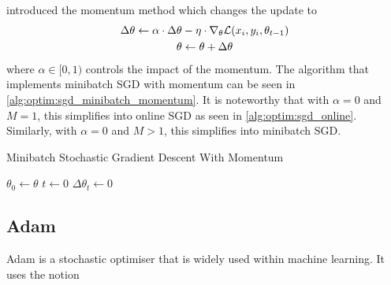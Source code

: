 \cite{rumelhart_learning_1986} introduced the momentum method which changes the update to
\begin{equation}
    \begin{gathered}
        \Delta \theta \leftarrow \alpha \cdot \Delta \theta - \eta  \cdot \nabla_\theta \mathcal{L}(x_i, y_i,\theta_{t-1}) \\
        \theta \leftarrow \theta + \Delta \theta
    \end{gathered}
\end{equation}
where $\alpha \in [0,1)$ controls the impact of the momentum. The algorithm that implements minibatch SGD with momentum can be seen in \autoref{alg:optim:sgd_minibatch_momentum}. It is noteworthy that with $\alpha = 0$ and $M = 1$, this simplifies into online SGD as seen in \autoref{alg:optim:sgd_online}. Similarly, with $\alpha = 0$ and $M > 1$, this simplifies into minibatch SGD.
\begin{algorithm}
    \caption{Minibatch Stochastic Gradient Descent With Momentum\label{alg:optim:sgd_minibatch_momentum}}
    $\theta_0 \longleftarrow \theta$ \;
    $t \longleftarrow 0$ \;
    $\Delta \theta_t \longleftarrow 0$ \;
\end{algorithm}

\subsection{Adam}

Adam \cite{kingma_adam_2017} is a stochastic optimiser that is widely used within machine learning. It uses the notion

